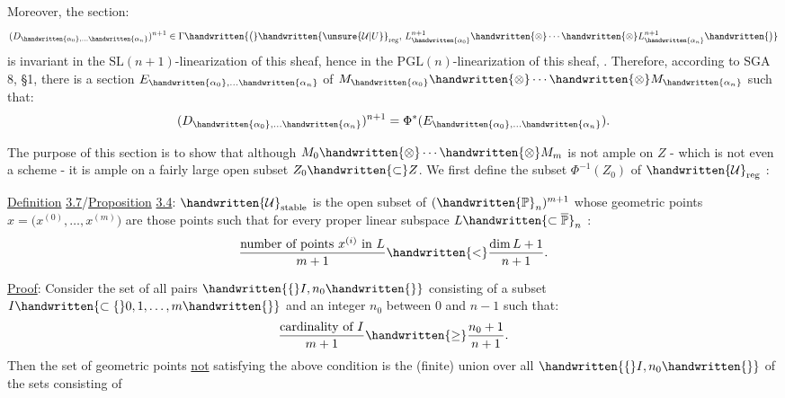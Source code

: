
Moreover, the section:
\[
(D_{\handwritten{\alpha_0},\ldots\handwritten{\alpha_n}})^{n+1}\in\Gamma\handwritten{\bigl(}\handwritten{\unsure{\mathcal U|U}}_{\mathrm{reg}},\,L_{\handwritten{\alpha_0}}^{n+1}\handwritten{\otimes}\cdots\handwritten{\otimes}L_{\handwritten{\alpha_n}}^{n+1}\handwritten{\bigr)}
\]
is invariant in the $\mathrm{SL}(n+1)$-linearization of this sheaf, hence in the $\mathrm{PGL}(n)$-linearization of this sheaf, . Therefore, according to SGA 8, \S1, there is a section $E_{\handwritten{\alpha_0},\ldots\handwritten{\alpha_n}}$ of $M_{\handwritten{\alpha_0}}\handwritten{\otimes}\cdots\handwritten{\otimes}M_{\handwritten{\alpha_n}}$ such that:
\[
(D_{\handwritten{\alpha_0},\ldots\handwritten{\alpha_n}})^{n+1}=\Phi^*(E_{\handwritten{\alpha_0},\ldots\handwritten{\alpha_n}}).
\]

 The purpose of this section is to show that although $M_0\handwritten{\otimes}\cdots\handwritten{\otimes} M_m$ is not ample on $Z$ - which is not even a scheme - it is ample on a fairly large open subset $Z_0\handwritten{\subset}Z$. We first define the subset $\Phi^{-1}(Z_0)$ of $\handwritten{\mathcal U}_{\mathrm{reg}}$ :

\uline{Definition} \uline{3.7}/\uline{Proposition} \uline{3.4}: $\handwritten{\mathcal U}_{\mathrm{stable}}$ is the open subset of $(\handwritten{\mathbb P}_n)^{m+1}$ whose geometric points $x=\bigl(x^{(0)},\ldots,x^{(m)}\bigr)$ are those points such that for every proper linear subspace $L\handwritten{\subset\overline{\mathbb P}}_n$ :
\[
\frac{\text{number of points }x^{(i)}\text{ in }L}{m+1}\handwritten{<}\frac{\dim L+1}{n+1}.
\]

\uline{Proof}: Consider the set of all pairs $\handwritten{\{}I,n_0\handwritten{\}}$ consisting of a subset $I\handwritten{\subset\{}0,1,\ldots,m\handwritten{\}}$ and an integer $n_0$ between $0$ and $n-1$ such that:
\[
\frac{\text{cardinality of }I}{m+1}\handwritten{\geq}\frac{n_0+1}{n+1}.
\]
Then the set of geometric points \uline{not} satisfying the above condition is the (finite) union over all $\handwritten{\{}I,n_0\handwritten{\}}$ of the sets consisting of

